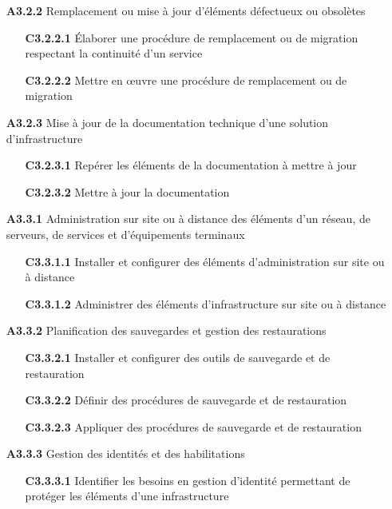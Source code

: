 \documentclass[12pt,a4paper,oneside,titlepage,final]{article}
\begin{document}
\begin{enumerate}
  \item [\textbf{A3.2.2}] Remplacement ou mise à jour d'éléments
  défectueux ou obsolètes
  \begin{itemize}
    \item [\textbf{C3.2.2.1}] Élaborer une procédure de
    remplacement ou de migration respectant la continuité d'un service
    \item [\textbf{C3.2.2.2}] Mettre en œuvre une procédure de
    remplacement ou de migration
  \end{itemize}
  \item [\textbf{A3.2.3}] Mise à jour de la documentation technique
  d'une solution d'infrastructure
  \begin{itemize}
    \item [\textbf{C3.2.3.1}] Repérer les éléments de la
    documentation à mettre à jour
    \item [\textbf{C3.2.3.2}] Mettre à jour la documentation
  \end{itemize}
  \item [\textbf{A3.3.1}] Administration sur site ou à distance des
  éléments d'un réseau, de serveurs, de services et d'équipements
  terminaux
  \begin{itemize}
    \item [\textbf{C3.3.1.1}] Installer et configurer des
    éléments d'administration sur site ou à distance
    \item [\textbf{C3.3.1.2}] Administrer des éléments
    d'infrastructure sur site ou à distance
  \end{itemize}
  \item [\textbf{A3.3.2}] Planification des sauvegardes et gestion des
  restaurations
  \begin{itemize}
    \item [\textbf{C3.3.2.1}] Installer et configurer des outils
    de sauvegarde et de restauration
    \item [\textbf{C3.3.2.2}] Définir des procédures de sauvegarde et
    de restauration
    \item [\textbf{C3.3.2.3}] Appliquer des procédures de sauvegarde
    et de restauration
  \end{itemize}
  \item [\textbf{A3.3.3}] Gestion des identités et des habilitations
  \begin{itemize}
    \item [\textbf{C3.3.3.1}] Identifier les besoins en gestion
    d'identité permettant de protéger les éléments d'une
    infrastructure

\end{itemize}
\end{enumerate}
\end{document}
